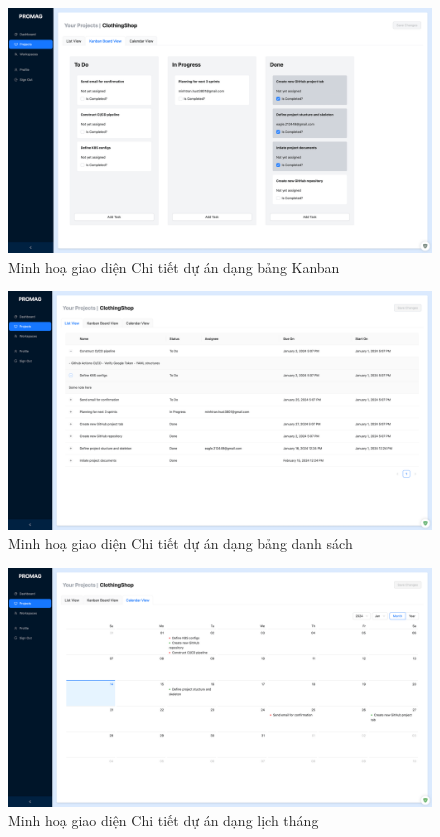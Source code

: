 \documentclass[../DoAn.tex]{subfiles}
\begin{document}
\newpage

\begin{figure}[H]
    \centering
    \includegraphics[width=1.0\linewidth]{Hinhve/Screenshot_KanbanBoard.png}
    \caption{Minh hoạ giao diện Chi tiết dự án dạng bảng Kanban}
    \label{fig:Screenshot_KanbanBoard}
\end{figure}

\begin{figure}[H]
    \centering
    \includegraphics[width=1.0\linewidth]{Hinhve/Screenshot_ListView.png}
    \caption{Minh hoạ giao diện Chi tiết dự án dạng bảng danh sách}
    \label{fig:Screenshot_ListView}
\end{figure}

\newpage

\begin{figure}[H]
    \centering
    \includegraphics[width=1.0\linewidth]{Hinhve/Screenshot_CalendarViewMonth.png}
    \caption{Minh hoạ giao diện Chi tiết dự án dạng lịch tháng}
    \label{fig:Screenshot_CalendarViewMonth}
\end{figure}
\end{document}
